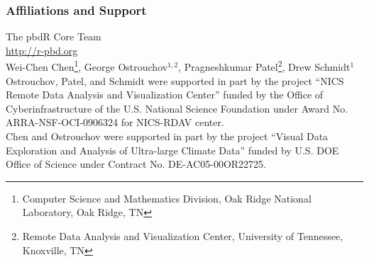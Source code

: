 \frame{
  \maketitle
}

\begin{frame}[noframenumbering]
\frametitle{Affiliations and Support}
{\small
The pbdR Core Team\\ \url{http://r-pbd.org}
\\[.4cm]
Wei-Chen Chen\footnote{\tiny{Computer Science and Mathematics Division, Oak Ridge National Laboratory, Oak Ridge, TN}}, 
George Ostrouchov$^{1,2}$, 
Pragneshkumar Patel\footnote{\tiny{Remote Data Analysis and Visualization Center, University of Tennessee, Knoxville, TN}}, 
Drew Schmidt$^1$
\\[.4cm]
Ostrouchov, Patel, and Schmidt were supported in part by the project
``NICS Remote Data Analysis and Visualization Center''
funded by the Office of Cyberinfrastructure of the
U.S. National Science Foundation
under Award No. ARRA-NSF-OCI-0906324 for NICS-RDAV center.\\[.4cm]
Chen and Ostrouchov were supported in part by the project
``Visual Data Exploration and Analysis of Ultra-large Climate Data''
funded by U.S. DOE Office of Science
under Contract No. DE-AC05-00OR22725.\\
}
\end{frame}



